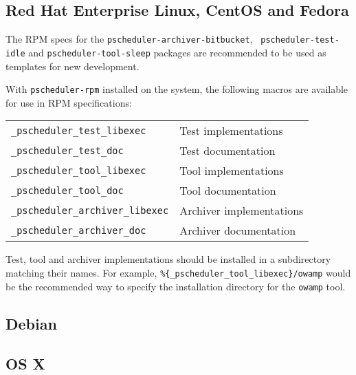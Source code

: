 \documentclass[10pt,titlepage]{article}
\begin{document}
\subsection{Red Hat Enterprise Linux, CentOS and Fedora}

The RPM specs for the {\tt pscheduler-archiver-bitbucket}, {\tt
  pscheduler-test-idle} and {\tt pscheduler-tool-sleep} packages are
recommended to be used as templates for new development.

With {\tt pscheduler-rpm} installed on the system, the following
macros are available for use in RPM specifications:
\begin{center}
  \begin{tabular}{ll} 
    {\tt _pscheduler_test_libexec} & Test implementations \\
    {\tt _pscheduler_test_doc} & Test documentation \\
    {\tt _pscheduler_tool_libexec} & Tool implementations \\
    {\tt _pscheduler_tool_doc} & Tool documentation \\
    {\tt _pscheduler_archiver_libexec} & Archiver implementations \\
    {\tt _pscheduler_archiver_doc} & Archiver documentation \\
  \end{tabular}
\end{center}

Test, tool and archiver implementations should be installed in a
subdirectory matching their names.  For example,
{\tt\%\{_pscheduler_tool_libexec\}/owamp} would be the recommended
way to specify the installation directory for the {\tt owamp} tool.

\subsection{Debian}

\subsection{OS X}
\end{document}
